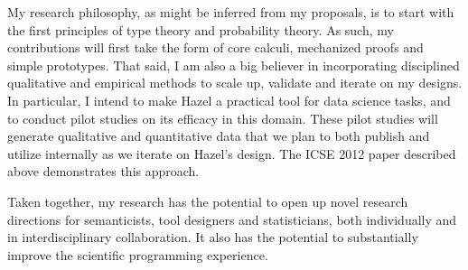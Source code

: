 \documentclass[10pt]{article}
\begin{document}
My research philosophy, as might be inferred from my proposals, is to start with the first principles of type theory and probability theory. As such, my contributions will first take the form of core calculi, mechanized proofs and simple prototypes. That said, I am also a big believer in incorporating disciplined qualitative and empirical methods to scale up, validate and iterate on my designs. In particular, I intend to make Hazel a practical tool for data science tasks, and to conduct pilot studies on its efficacy in this domain. These pilot studies will generate qualitative and quantitative data that we plan to both publish and utilize internally as we iterate on Hazel's design. The ICSE 2012 paper described above demonstrates this approach.

 Taken together, my research has the potential to open up novel research directions for semanticists, tool designers and statisticians, both individually and in interdisciplinary collaboration. It also has the potential to substantially improve the scientific programming experience. %
\end{document}
